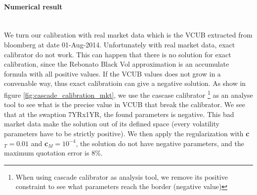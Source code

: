 \documentclass[a4paper,10pt]{article}
\begin{document}
\paragraph{Numerical result}\mbox{}\\
We turn our calibration with real market data which is the VCUB extracted from bloomberg at date 01-Aug-2014. Unfortunately with real market data, exact calibrator do not work. This can happen that there is no solution for exact calibration, since the Rebonato Black Vol approximation is an accumulate formula with all positive values. If the VCUB values does not grow in a convenable way, thus exact calibratioin can give a negative solution. As show in figure \ref{fig:cascade_calibration_mkt}, we use the cascase calibrator \footnote{ When using cascade calibrator as analysis tool, we remove its positive constraint to see what parameters reach the border (negative value)} as an analyse tool to see what is the precise value in VCUB that break the calibrator. We see that at the swaption 7YRx1YR, the found parameters is negative. This bad market data make the solution out of its defined space (every volatility parameters have to be strictly positive). We then apply the regularization with \textbf{c}$_T=0.01$ and \textbf{c}$_M=10^{-4}$, the solution do not have negative parameters, and the maximum quotation error is 8\%.
\end{document}
